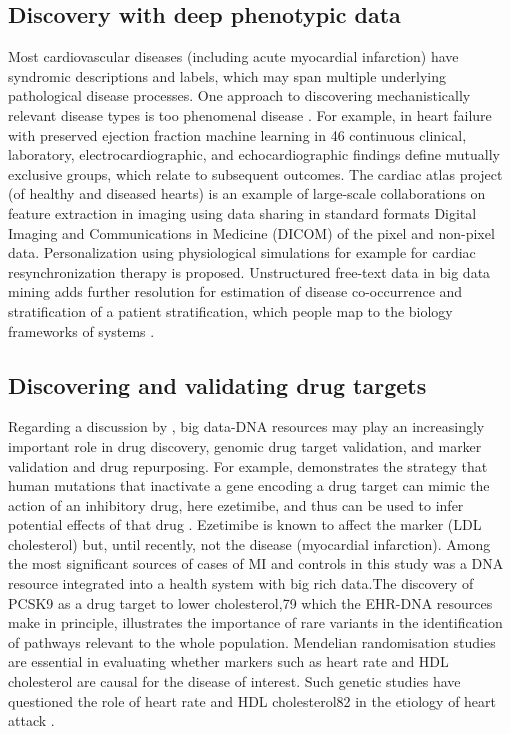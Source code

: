 \documentclass[sigconf]{acmart}
\begin{document}
\subsection{Discovery with deep phenotypic data}
Most cardiovascular diseases (including acute myocardial infarction) have syndromic descriptions and labels, which may span multiple underlying pathological disease processes. One approach to discovering mechanistically relevant disease types is too phenomenal disease \cite{rajkumar2010diagnosis}. For example, in heart failure with preserved ejection fraction machine learning in 46 continuous clinical, laboratory, electrocardiographic, and echocardiographic findings define mutually exclusive groups, which relate to subsequent outcomes. The cardiac atlas project (of healthy and diseased hearts) is an example of large-scale collaborations on feature extraction in imaging using data sharing in standard formats Digital Imaging and Communications in Medicine (DICOM) of the pixel and non-pixel data. Personalization using physiological simulations for example for cardiac resynchronization therapy is proposed. Unstructured free-text data in big data mining adds further resolution for estimation of disease co-occurrence and stratification of a patient stratification, which people map to the biology frameworks of systems \cite{rajkumar2010diagnosis}.

\subsection{Discovering and validating drug targets}
Regarding a discussion by \cite{rajkumar2010diagnosis}, big data-DNA resources may play an increasingly important role in drug discovery, genomic drug target validation, and marker validation and drug repurposing. For example, demonstrates the strategy that human mutations that inactivate a gene encoding a drug target can mimic the action of an inhibitory drug, here ezetimibe, and thus can be used to infer potential effects of that drug \cite{rajkumar2010diagnosis}.  Ezetimibe is known to affect the marker (LDL cholesterol) but, until recently, not the disease (myocardial infarction). 
Among the most significant sources of cases of MI and controls in this study was a DNA resource integrated into a health system with big rich data.The discovery of PCSK9 as a drug target to lower cholesterol,79 which the EHR-DNA resources make in principle, illustrates the importance of rare variants in the identification of pathways relevant to the whole population. Mendelian randomisation studies are essential in evaluating whether markers such as heart rate and HDL cholesterol are causal for the disease of interest. Such genetic studies have questioned the role of heart rate and HDL cholesterol82 in the etiology of heart attack \citep{palaniappan2008intelligent}.
\end{document}

